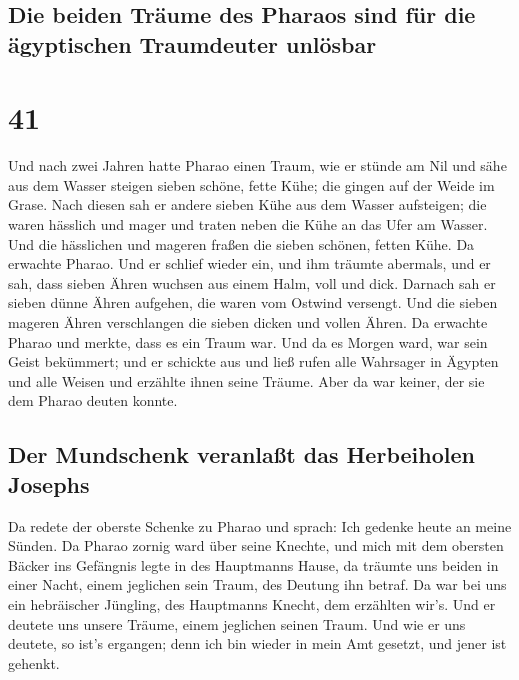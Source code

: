 \hypertarget{die-beiden-truxe4ume-des-pharaos-sind-fuxfcr-die-uxe4gyptischen-traumdeuter-unluxf6sbar}{%
\subsection{Die beiden Träume des Pharaos sind für die ägyptischen
Traumdeuter
unlösbar}\label{die-beiden-truxe4ume-des-pharaos-sind-fuxfcr-die-uxe4gyptischen-traumdeuter-unluxf6sbar}}

\hypertarget{section-40}{%
\section{41}\label{section-40}}

 Und nach zwei Jahren hatte Pharao einen Traum, wie er
stünde am Nil  und sähe aus dem Wasser steigen sieben
schöne, fette Kühe; die gingen auf der Weide im Grase. 
Nach diesen sah er andere sieben Kühe aus dem Wasser aufsteigen; die
waren hässlich und mager und traten neben die Kühe an das Ufer am
Wasser.  Und die hässlichen und mageren fraßen die sieben
schönen, fetten Kühe. Da erwachte Pharao.  Und er schlief
wieder ein, und ihm träumte abermals, und er sah, dass sieben Ähren
wuchsen aus einem Halm, voll und dick.  Darnach sah er
sieben dünne Ähren aufgehen, die waren vom Ostwind versengt.
 Und die sieben mageren Ähren verschlangen die sieben
dicken und vollen Ähren. Da erwachte Pharao und merkte, dass es ein
Traum war.  Und da es Morgen ward, war sein Geist
bekümmert; und er schickte aus und ließ rufen alle Wahrsager in Ägypten
und alle Weisen und erzählte ihnen seine Träume. Aber da war keiner, der
sie dem Pharao deuten konnte.

\hypertarget{der-mundschenk-veranlauxdft-das-herbeiholen-josephs}{%
\subsection{Der Mundschenk veranlaßt das Herbeiholen
Josephs}\label{der-mundschenk-veranlauxdft-das-herbeiholen-josephs}}

 Da redete der oberste Schenke zu Pharao und sprach: Ich
gedenke heute an meine Sünden.  Da Pharao zornig ward
über seine Knechte, und mich mit dem obersten Bäcker ins Gefängnis legte
in des Hauptmanns Hause,  da träumte uns beiden in einer
Nacht, einem jeglichen sein Traum, des Deutung ihn betraf.
 Da war bei uns ein hebräischer Jüngling, des Hauptmanns
Knecht, dem erzählten wir's. Und er deutete uns unsere Träume, einem
jeglichen seinen Traum.  Und wie er uns deutete, so ist's
ergangen; denn ich bin wieder in mein Amt gesetzt, und jener ist
gehenkt.

